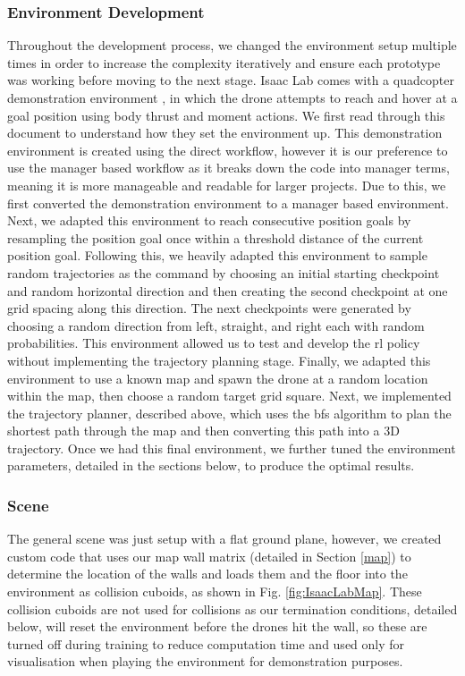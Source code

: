 \documentclass{report_template_oxford}
\begin{document}
\subsubsection{Environment Development} \label{RLEnvDevelopment}
Throughout the development process, we changed the environment setup multiple times in order to increase the complexity iteratively and ensure each prototype was working before moving to the next stage. Isaac Lab comes with a quadcopter demonstration environment \cite{IsaacLabQuadcopter}, in which the drone attempts to reach and hover at a goal position using body thrust and moment actions. We first read through this document to understand how they set the environment up. This demonstration environment is created using the direct workflow, however it is our preference to use the manager based workflow as it breaks down the code into manager terms, meaning it is more manageable and readable for larger projects. Due to this, we first converted the demonstration environment to a manager based environment. Next, we adapted this environment to reach consecutive position goals by resampling the position goal once within a threshold distance of the current position goal. Following this, we heavily adapted this environment to sample random trajectories as the command by choosing an initial starting checkpoint and random horizontal direction and then creating the second checkpoint at one grid spacing along this direction. The next checkpoints were generated by choosing a random direction from left, straight, and right each with random probabilities. This environment allowed us to test and develop the \gls{rl} policy without implementing the trajectory planning stage. Finally, we adapted this environment to use a known map and spawn the drone at a random location within the map, then choose a random target grid square. Next, we implemented the trajectory planner, described above, which uses the \gls{bfs} algorithm to plan the shortest path through the map and then converting this path into a 3D trajectory. Once we had this final environment, we further tuned the environment parameters, detailed in the sections below, to produce the optimal results.

\subsubsection{Scene}
The general scene was just setup with a flat ground plane, however, we created custom code that uses our map wall matrix (detailed in Section \ref{map}) to determine the location of the walls and loads them and the floor into the environment as collision cuboids, as shown in Fig. \ref{fig:IsaacLabMap}. These collision cuboids are not used for collisions as our termination conditions, detailed below, will reset the environment before the drones hit the wall, so these are turned off during training to reduce computation time and used only for visualisation when playing the environment for demonstration purposes.
\end{document}
